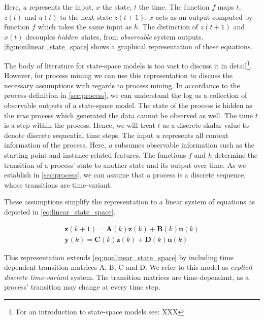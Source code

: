 \documentclass[12pt,a4paper]{report}
\begin{document}
Here, $u$ represents the input, $x$ the state, $t$ the time. The function $f$ maps $t$, $z(t)$ and $u(t)$ to the next state $z(t+1)$. $x$ acts as an output computed by function $f$ which takes the same input as $h$. The distinction of $z(t+1)$ and $x(t)$ decouples \emph{hidden}\footnotemark~states, from \emph{observable} system outputs. \autoref{fig:nonlinear_state_space} shows a graphical representation of these equations. 

The body of literature for state-space models is too vast to discuss it in detail\footnote{For an introduction to state-space models see: XXX}. However, for process mining we can use this representation to discuss the necessary assumptions with regards to process mining. 
In accordance to the process-definition in \autoref{sec:process}, we can understand the \gls{log} as a collection of observable outputs of a state-space model. The state of the process is hidden as the \emph{true} process which generated the data cannot be observed as well. The time $t$ is a step within the process. Hence, we will treat $t$ as a discrete skalar value to denote discrete sequential time steps. The input $u$ represents all context information of the process. Here, $u$ subsumes observable information such as the starting point and \gls{instance}-related features. The functions $f$ and $h$ determine the transition of a process' state to another state and its output over time. As we establish in \autoref{sec:process}, we can assume that a process is a discrete sequence, whose transitions are time-variant. 
\begin{optional*}
    These assumptions simplify the representation to a linear system of equations as depicted in \autoref{eq:linear_state_space}. 

    \begin{equation}
        \label{eq:linear_state_space}
        \begin{array}{l}
        \mathbf{z}(k+1)=\mathbf{A}(k) \mathbf{z}(k)+\mathbf{B}(k) \mathbf{u}(k) \\
        \mathbf{y}(k)=\mathbf{C}(k) \mathbf{z}(k)+\mathbf{D}(k) \mathbf{u}(k)
        \end{array}
    \end{equation}

    This representation extends \autoref{eq:nonlinear_state_space} by including time dependent transition matrices A, B, C and D. We refer to this model as \emph{explicit discrete time-variant} system. The transition matrices are time-dependant, as a process' transition may change at every time step.\end{optional*} 
    
\end{document}
